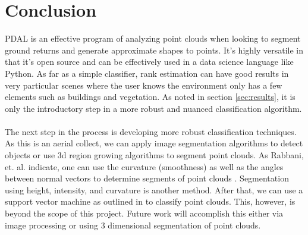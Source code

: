 \documentclass[11pt]{article}
\theoremstyle{definition}
\begin{document}
\section{Conclusion}
PDAL is an effective program of analyzing point clouds when looking to segment ground returns and generate approximate shapes to points.  It's highly versatile in that it's open source and can be effectively used in a data science language like Python.  As far as a simple classifier, rank estimation can have good results in very particular scenes where the user knows the environment only has a few elements such as buildings and vegetation.  As noted in section \ref{sec:results}, it is only the introductory step in a more robust and nuanced classification algorithm.
\\\\
The next step in the process is developing more robust classification techniques.  As this is an aerial collect, we can apply image segmentation algorithms to detect objects or use 3d region growing algorithms to segment point clouds.  As Rabbani, et. al. indicate, one can use the curvature (smoothness) as well as the angles between normal vectors to determine segments of point clouds \cite{rabbani2006segmentation}.  Segmentation using height, intensity, and curvature is another method.  After that, we can use a support vector machine as outlined in \cite{varney} to classify point clouds.  This, however, is beyond the scope of this project.  Future work will accomplish this either via image processing or using 3 dimensional segmentation of point clouds. 
\newpage


	
	
\end{document}
